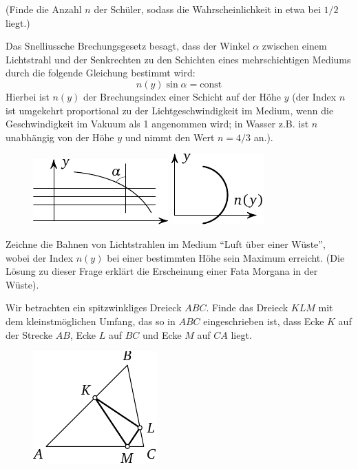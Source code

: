 \documentclass[12pt]{article} %
\begin{document}
\medskip
(Finde die Anzahl $n$ der Schüler, sodass die Wahrscheinlichkeit in etwa bei $1/2$ liegt.) 

\bigskip
{} Das Snelliussche Brechungsgesetz besagt, dass der Winkel $\alpha$ zwischen einem Lichtstrahl und der Senkrechten zu den Schichten eines mehrschichtigen Mediums durch die folgende Gleichung bestimmt wird: 
\[n(y) \sin \alpha=\text{const}\]
Hierbei ist $n(y)$ der Brechungsindex einer Schicht auf der Höhe $y$ (der Index $n$ ist umgekehrt proportional zu der Lichtgeschwindigkeit im Medium, wenn die Geschwindigkeit im Vakuum als 1 angenommen wird; in  Wasser z.B. ist $n$ unabhängig von der Höhe $y$ und nimmt den Wert $n=4/3$ an.).
\begin{figure}[h]
\centering
\includegraphics{taskbook-47}\hskip2cm
\includegraphics{taskbook-471}
\end{figure}

Zeichne die Bahnen von Lichtstrahlen im Medium “Luft über einer Wüste”, wobei der Index $n(y)$ bei einer bestimmten Höhe sein Maximum erreicht. (Die Lösung zu dieser Frage erklärt die Erscheinung einer Fata Morgana in der Wüste).

\newpage
{} Wir betrachten ein spitzwinkliges Dreieck $ABC$. Finde das Dreieck $KLM$ mit dem kleinstmöglichen Umfang, das so in $ABC$ eingeschrieben ist, dass Ecke $K$ auf der Strecke $AB$, Ecke $L$ auf $BC$ und Ecke $M$ auf $CA$ liegt. 
\begin{figure}[h]
\centering
\includegraphics{taskbook-48} 
\end{figure}
\end{document}
